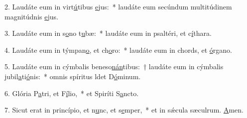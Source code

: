 2. Laudáte eum in virt\uline{ú}tibus \uline{e}jus:~* laudáte eum secúndum multitúdinem magnitúdnis \uline{e}jus.\par 
3. Laudáte eum in s\uline{o}no t\uline{u}bæ:~* laudáte eum in psaltéri, et c\uline{í}thara.\par 
4. Laudáte eum in týmpan\uline{o}, et ch\uline{o}ro:~* laudáte eum in chords, et \uline{ó}rgano.\par 
5. Laudáte eum in cýmbalis beneso\uline{nán}tibus:~† laudáte eum in cýmbalis jubil\uline{a}ti\uline{ó}nis:~* omnis spíritus ldet D\uline{ó}minum.\par 
6. Glória P\uline{a}tri, et F\uline{í}lio,~* et Spiríti S\uline{a}ncto.\par 
7. Sicut erat in princípio, et n\uline{u}nc, et s\uline{e}mper,~* et in sǽcula sæculrum. \uline{A}men.\par 
